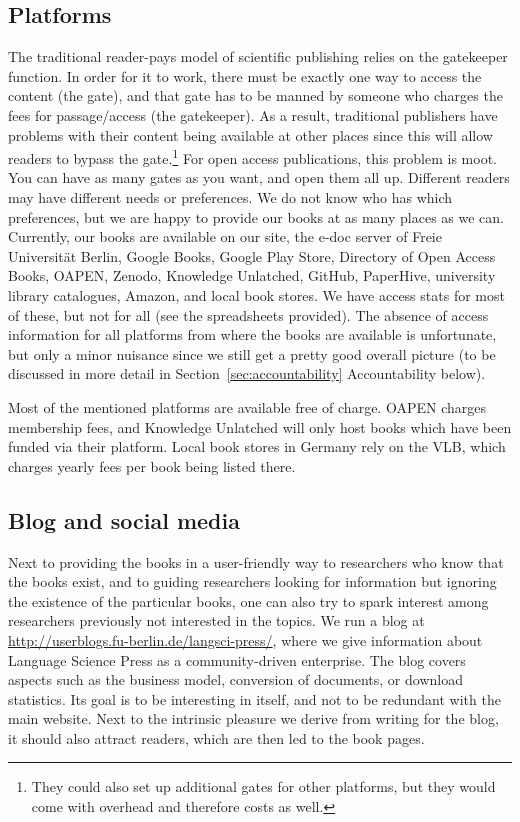 \documentclass[nonflat,modfonts,output=book] {langsci/langscibook}
\begin{document}
\subsection{Platforms}
The traditional reader-pays model of scientific publishing relies on the gatekeeper function. In order for it to work, there must be exactly one way to access the content (the gate), and that gate has to be manned by someone who charges the fees for passage\slash access (the gatekeeper). As a result, traditional publishers have problems with their content being available at other places since this will allow readers to bypass the gate.\footnote{They could also set up additional gates for other platforms, but they would come with overhead and therefore costs as well.} For open access publications, this problem is moot. You can have as many gates as you want, and open them all up. Different readers may have different needs or preferences. We do not know who has which preferences, but we are happy to provide our books at as many places as we can. Currently, our books are available on our site, the e-doc server of Freie Universität Berlin, Google Books, Google Play Store, Directory of Open Access Books, OAPEN, Zenodo, Knowledge Unlatched, GitHub, PaperHive, university library catalogues, Amazon, and local book stores. We have access stats for most of these, but not for all (see the spreadsheets provided). The absence of access information for all platforms from where the books are available is unfortunate, but only a minor nuisance since we still get a pretty good overall picture (to be discussed in more detail in Section~\ref{sec:accountability} Accountability below).

Most of the mentioned platforms are available free of charge. OAPEN charges membership fees, and Knowledge Unlatched will only host books which have been funded via their platform. Local book stores in Germany rely on the VLB, which charges yearly fees per book being listed there.

\subsection{Blog and social media}
Next to providing the books in a user-friendly way to researchers who know that the books exist, and to guiding researchers looking for information but ignoring the existence of the particular books, one can also try to spark interest among researchers previously not interested in the topics. We run a blog at \url{http://userblogs.fu-berlin.de/langsci-press/}, where we give information about Language Science Press as a community-driven enterprise. The blog covers aspects such as the business model, conversion of documents, or download statistics. Its goal is to be interesting in itself, and not to be redundant with the main website. Next to the intrinsic pleasure we derive from writing for the blog, it should also attract readers, which are then led to the book pages.  
\end{document}
